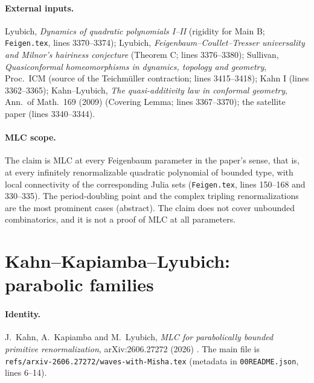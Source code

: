 \paragraph{External inputs.}
Lyubich, \emph{Dynamics of quadratic polynomials I--II} (rigidity for Main B; \texttt{Feigen.tex}, lines 3370--3374);
Lyubich, \emph{Feigenbaum--Coullet--Tresser universality and Milnor's hairiness conjecture} (Theorem C; lines 3376--3380);
Sullivan, \emph{Quasiconformal homeomorphisms in dynamics, topology and geometry}, Proc.\ ICM (source of the
Teichm\"uller contraction; lines 3415--3418); Kahn I (lines 3362--3365); Kahn--Lyubich, \emph{The quasi-additivity
law in conformal geometry}, Ann.\ of Math.\ 169 (2009) (Covering Lemma; lines 3367--3370); the satellite paper
(lines 3340--3344).

\paragraph{MLC scope.}
The claim is MLC at every Feigenbaum parameter in the paper's sense, that is, at every infinitely renormalizable
quadratic polynomial of bounded type, with local connectivity of the corresponding Julia sets
(\texttt{Feigen.tex}, lines 150--168 and 330--335).  The period-doubling point and the complex tripling renormalizations
are the most prominent cases (abstract).  The claim does not cover unbounded combinatorics, and it is not a proof of MLC at all
parameters.

\section{Kahn--Kapiamba--Lyubich: parabolic families}
\label{sec:kkl}

\paragraph{Identity.}
J.~Kahn, A.~Kapiamba and M.~Lyubich, \emph{MLC for parabolically bounded primitive renormalization}, arXiv:2606.27272
(2026) \cite{KahnKapiambaLyubich}.  The main file is \texttt{refs/arxiv-2606.27272/waves-with-Misha.tex} (metadata in
\texttt{00README.json}, lines 6--14).

